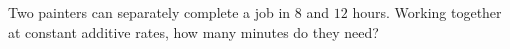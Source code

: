 Two painters can separately complete a job in $8$ and $12$ hours. Working together at constant additive rates, how many minutes do they need?
